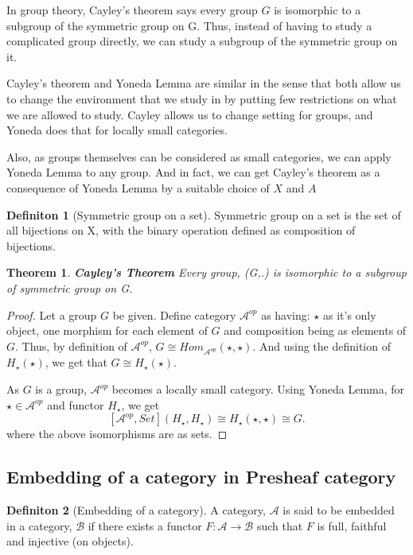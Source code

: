 \documentclass[18pt,a4paper]{article}
\newtheorem{theorem}{Theorem}[section]
\theoremstyle{definition}
\newtheorem{definition}{Definiton}[section]
\begin{document}
In group theory, Cayley's theorem says every group $G$ is isomorphic to a subgroup of the symmetric
group on G. Thus, instead of having to study a complicated group directly, we can study a subgroup of
the symmetric group on it.

Cayley's theorem and Yoneda Lemma are similar in the sense that both allow us to change the environment
that we study in by putting few restrictions on what we are allowed to study. Cayley allows us to
change setting for groups, and Yoneda does that for locally small categories.

Also, as groups themselves can be considered as small categories, we can apply Yoneda Lemma to any
group. And in fact, we can get Cayley's theorem as a consequence of Yoneda Lemma by a suitable
choice of $X$ and $A$
\begin{definition}[Symmetric group on a set] %
	Symmetric group on a set is the set of all bijections on X, with the binary operation
	defined as composition of bijections.
\end{definition}
\begin{theorem}{\textbf{Cayley's Theorem}} %
	Every group, (G,.) is isomorphic to a subgroup of symmetric group on G.
\end{theorem}
\begin{proof} Let a group $G$ be given.
	Define category $\mathcal{A} ^{op}$ as having: $\star$ as it's only object, one
	morphism for each element of $G$ and composition being as elements of $G$.
	Thus, by definition of $\mathcal{A} ^{op}$, $G\cong Hom_{\mathcal{A}^{op} }^{}(\star, \star).$
	And using the definition of $H_\star(\star)$, we get that $G \cong H_\star(\star)$.

	As $G$ is a group, $\mathcal{A}^{op}$ becomes a locally small category. Using Yoneda Lemma,
	for $\star \in \mathcal{A} ^{op}$ and functor $H_\star$, we get
	\[ [ \mathcal{A} ^{op}, Set](H_\star,H_\star) \cong H_\star(\star,\star) \cong G .\]
	where the above isomorphisms are as sets.
\end{proof}
\newpage

\subsection{Embedding of a category in Presheaf category}%

\begin{definition}[Embedding of a category] %
	A category, $\mathcal{A}$  is said to be embedded in a category, $\mathcal{B}$ if there exists a
	functor $F: \mathcal{A} \to \mathcal{B} $ such that $F$ is full, faithful and injective (on objects).
\end{definition} %
\end{document}
